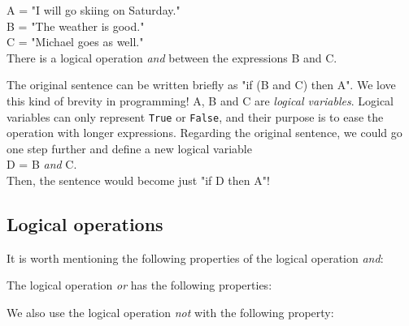 \documentclass[article,A4,12pt]{llncs}
\begin{document}
\noindent
A = "I will go skiing on Saturday."\\
B = "The weather is good."\\
C = "Michael goes as well."\\

\noindent
There is a logical operation {\em and} between the expressions B and C.

The original sentence can be written briefly as "if (B and C) then A". We love this kind of 
brevity in programming! A, B and C are {\em logical variables}. Logical variables 
can only represent {\tt True} or {\tt False}, and their purpose is to ease the operation with 
longer expressions.
Regarding the original sentence, we could go one step further and define a new logical variable\\

\noindent
D = B {\em and} C.\\

\noindent
Then, the sentence would become just "if D then A"! 

\subsection{Logical operations}

It is worth mentioning the following properties of the logical operation {\em and}:\\

\begin{center}
\end{center}
\vspace{4mm}
\noindent
The logical operation {\em or} has the following properties:\\

\begin{center}
\end{center}
\vspace{4mm}
\noindent
We also use the logical operation {\em not} with the following property:\\

\begin{center}
\end{center}
\end{document}

